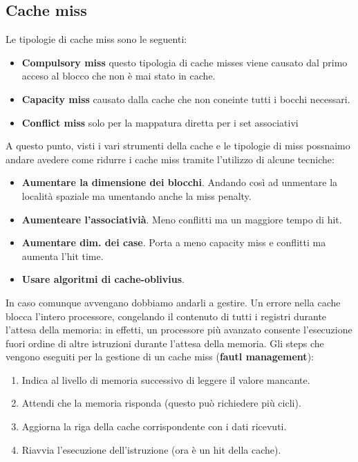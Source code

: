 \subsection{Cache miss}
Le tipologie di cache miss sono le seguenti:
\begin{itemize}
    \item \textbf{Compulsory miss} questo tipologia di cache misses viene causato dal primo acceso al blocco che non è mai stato in cache.
    \item \textbf{Capacity miss} causato dalla cache che non coneinte tutti i bocchi necessari.
    \item \textbf{Conflict miss} solo per la mappatura diretta per i set associativi
\end{itemize}
A questo punto, visti i vari strumenti della cache e le tipologie di miss possnaimo andare  avedere come ridurre i cache miss tramite l'utilizzo di alcune tecniche:
\begin{itemize}
    \item \textbf{Aumentare la dimensione dei blocchi}. Andando così ad unmentare la località spaziale ma umentando anche la miss penalty.
    \item \textbf{Aumenteare l'associativià}. Meno conflitti ma un maggiore tempo di hit.
    \item \textbf{Aumentare dim. dei case}. Porta a meno capacity miss e conflitti ma aumenta l'hit time.
    \item \textbf{Usare algoritmi di cache-oblivius}.
\end{itemize}
In caso comunque avvengano dobbiamo andarli a gestire. Un errore nella cache blocca l'intero processore, congelando 
il contenuto di tutti i registri durante l'attesa della memoria: in effetti, un processore più avanzato consente l'esecuzione fuori ordine di altre istruzioni durante l'attesa della memoria.
Gli steps che vengono eseguiti per la gestione di un cache miss (\textbf{fautl management}):
\begin{enumerate}
    \item Indica al livello di memoria successivo di leggere il valore mancante.
    \item Attendi che la memoria risponda (questo può richiedere più cicli).
    \item Aggiorna la riga della cache corrispondente con i dati ricevuti.
    \item Riavvia l'esecuzione dell'istruzione (ora è un hit della cache).
\end{enumerate}


